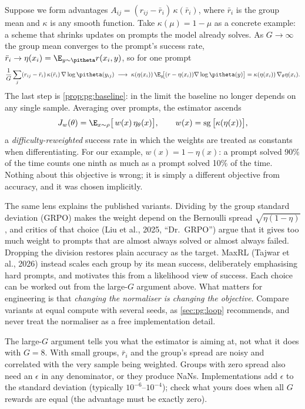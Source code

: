 Suppose we form advantages $A_{ij}=(r_{ij}-\bar r_i)\,\kappa(\bar r_i)$, where
$\bar r_i$ is the group mean and $\kappa$ is any smooth function. Take
$\kappa(\mu)=1-\mu$ as a concrete example: a scheme that shrinks updates on prompts the model
already solves. As $G\to\infty$ the group mean converges to the prompt's success rate,
$\bar r_i\to\eta(x_i)=\E_{y\sim\pitheta}r(x_i,y)$, so for one prompt
\begin{equation}
\frac1G\sum_j (r_{ij}-\bar r_i)\,\kappa(\bar r_i)\,\nabla\log\pitheta(y_{ij})
\;\longrightarrow\;\kappa(\eta(x_i))\,\E_y\!\big[(r-\eta(x_i))\nabla\log\pitheta(y)\big]
=\kappa(\eta(x_i))\,\nabla_\theta\eta(x_i).
\end{equation}
The last step is \cref{prop:pg:baseline}: in the limit the baseline no longer depends on any
single sample. Averaging over prompts, the estimator ascends
\begin{equation}
J_w(\theta)=\E_{x\sim\rho}\big[\,w(x)\,\eta_\theta(x)\big],\qquad
w(x)=\operatorname{sg}\big[\kappa(\eta(x))\big],
\end{equation}
a \emph{difficulty-reweighted} success rate in which the weights are treated as constants
when differentiating. For our example, $w(x)=1-\eta(x)$: a prompt solved 90\% of the time
counts one ninth as much as a prompt solved 10\% of the time. Nothing about this objective is
wrong; it is simply a different objective from accuracy, and it was chosen implicitly.

The same lens explains the published variants. Dividing by the group standard deviation
(GRPO) makes the weight depend on the Bernoulli spread $\sqrt{\eta(1-\eta)}$, and critics of
that choice (Liu et al., 2025, ``Dr.\ GRPO'') argue that it gives too much weight to prompts
that are almost always solved or almost always failed. Dropping the division restores plain
accuracy as the target. MaxRL (Tajwar et al., 2026) instead scales each group by its mean
success, deliberately emphasising hard prompts, and motivates this from a likelihood view of
success. Each choice can be worked out from the large-$G$ argument above. What matters for
engineering is that \emph{changing the normaliser is changing the objective}. Compare
variants at equal compute with several seeds, as \cref{sec:pg:loop} recommends, and never
treat the normaliser as a free implementation detail.

\begin{pitfall}
The large-$G$ argument tells you what the estimator is aiming at, not what it does with
$G=8$. With small groups, $\bar r_i$ and the group's spread are noisy and correlated with
the very sample being weighted. Groups with zero spread also need an $\epsilon$ in any
denominator, or they produce NaNs. Implementations add $\epsilon$ to the standard deviation
(typically $10^{-6}$--$10^{-4}$); check what yours does when all $G$ rewards are equal (the
advantage must be exactly zero).
\end{pitfall}


